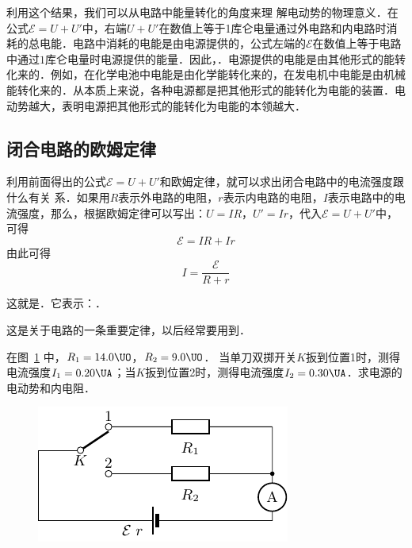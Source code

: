 利用这个结果，我们可以从电路中能量转化的角度来理
解电动势的物理意义．在公式$\mathcal{E}=U+U'$中，右端$U+U'$在数值上等于1库仑电量通过外电路和内电路时消耗的总电能．电路中消耗的电能是由电源提供的，公式左端的$\mathcal{E}$在数值上等于电路中通过$1$库仑电量时电源提供的能量．因此，．电源提供的电能是由其他形式的能转化来的．例如，在化学电池中电能是由化学能转化来的，在发电机中电能是由机械能转化来的．从本质上来说，各种电源都是把其他形式的能转化为电能的装置．电动势越大，表明电源把其他形式的能转化为电能的本领越大．

\subsection{闭合电路的欧姆定律}

利用前面得出的公式$\mathcal{E}=U+U'$和欧姆定律，就可以求出闭合电路中的电流强度跟什么有关
系．如果用$R$表示外电路的电阻，$r$表示内电路的电阻，$I$表示电路中的电流强度，那么，根据欧姆定律可以写出：$U=IR$，$U'=Ir$，代入$\mathcal{E}=U+U'$中，可得
\[\mathcal{E}=IR+Ir \]
由此可得
\[I=\frac{\mathcal{E}}{R+r} \]

这就是．它表示：．

这是关于电路的一条重要定律，以后经常要用到．

\begin{example}
在图~\ref{fig_B_7-27} 中，$R_1=14.0 \UO$，$R_2=9.0 \UO$．
当单刀双掷开关$K$扳到位置1时，测得电流强度$I_1=0.20\UA $；当$K$扳到位置2时，测得电流强度$I_2=0.30\UA $．求电源的电动势和内电阻．
\end{example}
\begin{figure}[htbp]
    \centering
    \includegraphics{fig/B/7-27.pdf}
    \caption{}\label{fig_B_7-27}
\end{figure}

